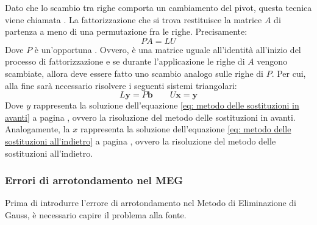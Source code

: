 \highspace
Dato che lo scambio tra righe comporta un cambiamento del pivot, questa tecnica viene chiamata . La fattorizzazione che si trova restituisce la matrice $A$ di partenza a meno di una permutazione fra le righe. Precisamente:
\begin{equation}\label{eq: pivoting}
    PA = LU
\end{equation}
Dove $P$ è un'opportuna . Ovvero, è una matrice uguale all'identità all'inizio del processo di fattorizzazione e se durante l'applicazione le righe di $A$ vengono scambiate, allora deve essere fatto uno scambio analogo sulle righe di $P$. Per cui, alla fine sarà necessario risolvere i seguenti sistemi triangolari:
\begin{equation}\label{eq: pivoting - sistemi triangolari}
    L\mathbf{y} = P\mathbf{b} \hspace{2em} U\mathbf{x} = \mathbf{y}
\end{equation}
Dove $y$ rappresenta la soluzione dell'equazione \ref{eq: metodo delle sostituzioni in avanti} a pagina \pageref{eq: metodo delle sostituzioni in avanti}, ovvero la risoluzione del metodo delle sostituzioni in avanti. Analogamente, la $x$ rappresenta la soluzione dell'equazione \ref{eq: metodo delle sostituzioni all'indietro} a pagina \pageref{eq: metodo delle sostituzioni all'indietro}, ovvero la risoluzione del metodo delle sostituzioni all'indietro.

\newpage

\subsubsection{Errori di arrotondamento nel MEG}

Prima di introdurre l'errore di arrotondamento nel Metodo di Eliminazione di Gauss, è necessario capire il problema alla fonte.

